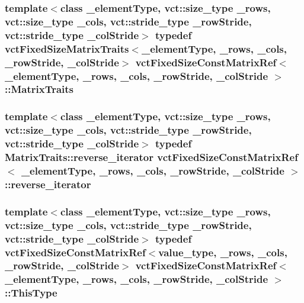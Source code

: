 \subsubsection[{Matrix\+Traits}]{\setlength{\rightskip}{0pt plus 5cm}template$<$class \+\_\+element\+Type, vct\+::size\+\_\+type \+\_\+rows, vct\+::size\+\_\+type \+\_\+cols, vct\+::stride\+\_\+type \+\_\+row\+Stride, vct\+::stride\+\_\+type \+\_\+col\+Stride$>$ typedef {\bf vct\+Fixed\+Size\+Matrix\+Traits}$<$\+\_\+element\+Type, \+\_\+rows, \+\_\+cols, \+\_\+row\+Stride, \+\_\+col\+Stride$>$ {\bf vct\+Fixed\+Size\+Const\+Matrix\+Ref}$<$ \+\_\+element\+Type, \+\_\+rows, \+\_\+cols, \+\_\+row\+Stride, \+\_\+col\+Stride $>$\+::{\bf Matrix\+Traits}}\label{classvct_fixed_size_const_matrix_ref_ac6b99932c13ec23f2c083fc719af757e}
\hypertarget{classvct_fixed_size_const_matrix_ref_a1c9aa87e0184cf645405b6c8618f1223}{}
\subsubsection[{reverse\+\_\+iterator}]{\setlength{\rightskip}{0pt plus 5cm}template$<$class \+\_\+element\+Type, vct\+::size\+\_\+type \+\_\+rows, vct\+::size\+\_\+type \+\_\+cols, vct\+::stride\+\_\+type \+\_\+row\+Stride, vct\+::stride\+\_\+type \+\_\+col\+Stride$>$ typedef {\bf Matrix\+Traits\+::reverse\+\_\+iterator} {\bf vct\+Fixed\+Size\+Const\+Matrix\+Ref}$<$ \+\_\+element\+Type, \+\_\+rows, \+\_\+cols, \+\_\+row\+Stride, \+\_\+col\+Stride $>$\+::{\bf reverse\+\_\+iterator}}\label{classvct_fixed_size_const_matrix_ref_a1c9aa87e0184cf645405b6c8618f1223}
\hypertarget{classvct_fixed_size_const_matrix_ref_a725e99847915984b03843f96054b07d5}{}
\subsubsection[{This\+Type}]{\setlength{\rightskip}{0pt plus 5cm}template$<$class \+\_\+element\+Type, vct\+::size\+\_\+type \+\_\+rows, vct\+::size\+\_\+type \+\_\+cols, vct\+::stride\+\_\+type \+\_\+row\+Stride, vct\+::stride\+\_\+type \+\_\+col\+Stride$>$ typedef {\bf vct\+Fixed\+Size\+Const\+Matrix\+Ref}$<$value\+\_\+type, \+\_\+rows, \+\_\+cols, \+\_\+row\+Stride, \+\_\+col\+Stride$>$ {\bf vct\+Fixed\+Size\+Const\+Matrix\+Ref}$<$ \+\_\+element\+Type, \+\_\+rows, \+\_\+cols, \+\_\+row\+Stride, \+\_\+col\+Stride $>$\+::{\bf This\+Type}}\label{classvct_fixed_size_const_matrix_ref_a725e99847915984b03843f96054b07d5}


